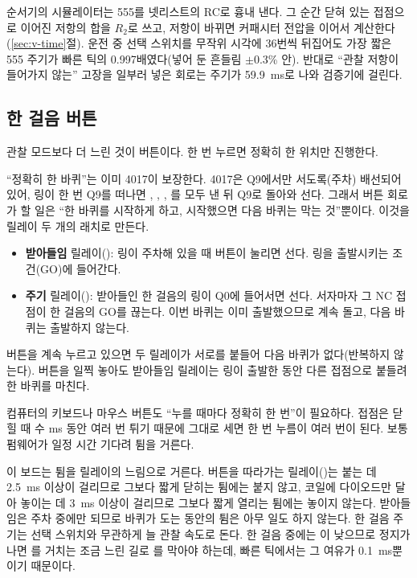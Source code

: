 \Ours 순서기의 시뮬레이터는 555를 넷리스트의 RC로 흉내 낸다. 그 순간 닫혀 있는 접점으로 이어진 저항의 합을
$R_2$로 쓰고, 저항이 바뀌면 커패시터 전압을 이어서 계산한다(\ref{sec:v-time}절). 운전 중 선택 스위치를 무작위
시각에 36번씩 뒤집어도 가장 짧은 555 주기가 빠른 틱의 0.997배였다(넣어 둔 흔들림 $\pm$0.3\% 안). 반대로
``관찰 저항이 들어가지 않는'' 고장을 일부러 넣은 회로는 주기가 59.9~ms로 나와 검증기에 걸린다.

\subsection{한 걸음 버튼}

관찰 모드보다 더 느린 것이  버튼이다. 한 번 누르면 정확히 한 위치만 진행한다.

\Why ``정확히 한 바퀴''는 이미 4017이 보장한다. 4017은 Q9에서만 서도록(주차) 배선되어 있어, 링이 한 번 Q9를
떠나면 , , , 를 모두 낸 뒤 Q9로 돌아와 선다. 그래서 버튼 회로가 할
일은 ``한 바퀴를 시작하게 하고, 시작했으면 다음 바퀴는 막는 것''뿐이다. 이것을 릴레이 두 개의 래치로 만든다.
\begin{itemize}
\item \textbf{받아들임} 릴레이(): 링이 주차해 있을 때 버튼이 눌리면 선다. 링을 출발시키는 조건(GO)에
들어간다.
\item \textbf{주기} 릴레이(): 받아들인 한 걸음의 링이 Q0에 들어서면 선다. 서자마자 그 NC 접점이 한
걸음의 GO를 끊는다. 이번 바퀴는 이미 출발했으므로 계속 돌고, 다음 바퀴는 출발하지 않는다.
\end{itemize}
버튼을 계속 누르고 있으면 두 릴레이가 서로를 붙들어 다음 바퀴가 없다(반복하지 않는다). 버튼을 일찍 놓아도
받아들임 릴레이는 링이 출발한 동안 다른 접점으로 붙들려 한 바퀴를 마친다.

\General 컴퓨터의 키보드나 마우스 버튼도 ``누를 때마다 정확히 한 번''이 필요하다. 접점은 닫힐 때 수 ms 동안
여러 번 튀기 때문에 그대로 세면 한 번 누름이 여러 번이 된다. 보통 펌웨어가 일정 시간 기다려 튐을 거른다.

\Ours 이 보드는 튐을 릴레이의 느림으로 거른다. 버튼을 따라가는 릴레이()는 붙는 데 2.5~ms 이상이
걸리므로 그보다 짧게 닫히는 튐에는 붙지 않고, 코일에 다이오드만 달아 놓이는 데 3~ms 이상이 걸리므로 그보다
짧게 열리는 튐에는 놓이지 않는다. 받아들임은 주차 중에만 되므로 바퀴가 도는 동안의 튐은 아무 일도 하지 않는다.
한 걸음 주기는 선택 스위치와 무관하게 늘 관찰 속도로 돈다. 한 걸음 중에는 이 낮으므로 정지가 나면
를 거치는 조금 느린 길로 를 막아야 하는데, 빠른 틱에서는 그 여유가 0.1~ms뿐이기
때문이다.

